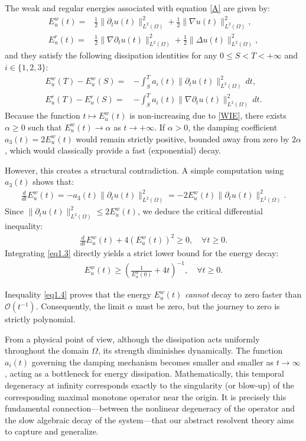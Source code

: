 \documentclass[11pt,reqno]{amsart}
\theoremstyle{remark}
\begin{document}
The weak and regular energies associated with equation \eqref{A} are given by:
\begin{align}
E_u^w(t)=&\frac{1}{2}\|\partial_t u(t)\|_{L^2(\Omega)}^2 + \frac{1}{2}\|\nabla u(t)\|_{L^2(\Omega)}^2, \label{WE}\\
E_u^r(t)=&\frac{1}{2}\|\nabla \partial_t u(t)\|_{L^2(\Omega)}^2 + \frac{1}{2}\|\Delta u(t)\|_{L^2(\Omega)}^2,\label{RE}
\end{align}
and they satisfy the following dissipation identities for any $0 \le S < T < +\infty$ and $i \in \{1,2,3\}$:
\begin{align}
E_u^w(T)- E_u^w(S)=&- \int_S^T a_i(t) \|\partial_t u(t)\|_{L^2(\Omega)}^2\,dt,\label{WIE}\\
E_u^r(T)- E_u^r(S)=&-\int_S^T a_i(t)\|\nabla \partial_t u(t)\|_{L^2(\Omega)}^2\,dt.\label{RIE}
\end{align}
Because the function $t \mapsto E_u^w(t)$ is non-increasing due to \eqref{WIE}, there exists $\alpha \ge 0$ such that $E_u^w(t) \rightarrow \alpha$ as $t\rightarrow + \infty$. If $\alpha > 0$, the damping coefficient $a_3(t) = 2 E_u^w(t)$ would remain strictly positive, bounded away from zero by $2\alpha$, which would classically provide a fast (exponential) decay.

However, this creates a structural contradiction. A simple computation using $a_3(t)$ shows that:
\begin{align*}
\frac{d}{dt} E^w_u(t) = - a_3(t) \|\partial_t u(t)\|_{L^2(\Omega)}^2 = - 2 E^w_u(t) \|\partial_t u(t)\|_{L^2(\Omega)}^2.
\end{align*}
Since $\|\partial_t u(t)\|_{L^2(\Omega)}^2 \le 2 E^w_u(t)$, we deduce the critical differential inequality:
\begin{align}\label{eq1.3}
\frac{d}{dt} E_u^w(t) + 4\left(E^w_u(t)\right)^2 \geq 0, \quad \forall t\geq 0.
\end{align}
Integrating \eqref{eq1.3} directly yields a strict lower bound for the energy decay:
\begin{align}\label{eq1.4}
E^w_u(t) \geq \left( \frac{1}{E^w_u(0)} + 4t\right)^{-1}, \quad \forall t\geq 0.
\end{align}

Inequality \eqref{eq1.4} proves that the energy $E^w_u(t)$ \textit{cannot} decay to zero faster than $\mathcal{O}(t^{-1})$. Consequently, the limit $\alpha$ must be zero, but the journey to zero is strictly polynomial.

From a physical point of view, although the dissipation acts uniformly throughout the domain $\Omega$, its strength diminishes dynamically. The function $a_i(t)$ governing the damping mechanism becomes smaller and smaller as $t \to \infty$, acting as a bottleneck for energy dissipation. Mathematically, this temporal degeneracy at infinity corresponds exactly to the singularity (or blow-up) of the corresponding maximal monotone operator near the origin. It is precisely this fundamental connection—between the nonlinear degeneracy of the operator and the slow algebraic decay of the system—that our abstract resolvent theory aims to capture and generalize.
\end{document}
